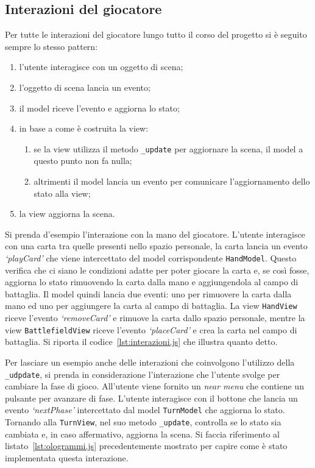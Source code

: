 \subsection{Interazioni del giocatore}
Per tutte le interazioni del giocatore lungo tutto il corso del progetto si è seguito sempre lo stesso pattern:
\begin{enumerate}
    \item l'utente interagisce con un oggetto di scena;
    \item l'oggetto di scena lancia un evento;
    \item il model riceve l'evento e aggiorna lo stato;
    \item in base a come è costruita la view:
    \begin{enumerate} 
        \item se la view utilizza il metodo \texttt{\_update} per aggiornare la scena, il model a questo punto non fa nulla;
        \item altrimenti il model lancia un evento per comunicare l'aggiornamento dello stato alla view;
    \end{enumerate} 
    \item la view aggiorna la scena.
\end{enumerate} 
Si prenda d'esempio l'interazione con la mano del giocatore. L'utente interagisce con una carta tra quelle presenti nello spazio personale, la carta lancia un evento \textit{`playCard'}
che viene intercettato del model corrispondente \texttt{HandModel}. Questo verifica che ci siano le condizioni adatte per poter giocare la carta e, se così fosse, aggiorna lo stato
rimuovendo la carta dalla mano e aggiungendola al campo di battaglia. Il model quindi lancia due eventi: uno per rimuovere la carta dalla mano ed uno per aggiungere la carta al
campo di battaglia. La view \texttt{HandView} riceve l'evento \textit{`removeCard'} e rimuove la carta dallo spazio personale, mentre la view \texttt{BattlefieldView} riceve l'evento
\textit{`placeCard'} e crea la carta nel campo di battaglia. Si riporta il codice~\ref{lst:interazioni.js} che illustra quanto detto.

Per lasciare un esempio anche delle interazioni che coinvolgono l'utilizzo della \texttt{\_udpdate}, si prenda in considerazione l'interazione che l'utente svolge per cambiare la 
fase di gioco. All'utente viene fornito un \textit{near menu} che contiene un pulsante per avanzare di fase. L'utente interagisce con il bottone che lancia un evento 
\textit{`nextPhase'} intercettato dal model \texttt{TurnModel} che aggiorna lo stato. Tornando alla \texttt{TurnView}, nel suo metodo \texttt{\_update}, controlla se lo stato sia
cambiata e, in caso affermativo, aggiorna la scena. Si faccia riferimento al listato~\ref{lst:ologrammi.js} precedentemente mostrato per capire come è stato implementata questa
interazione.


